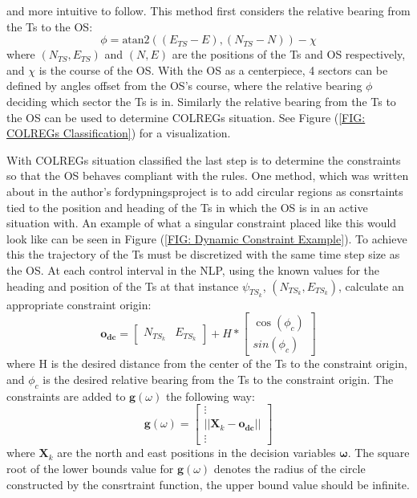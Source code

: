 and more intuitive to follow. This method first considers the relative bearing from the \gls{Ts} to the \gls{OS}:
\begin{equation}
    \phi = \textrm{atan2}((E_{TS} - E) , (N_{TS} - N)) - \chi
\end{equation}
where $(N_{TS}, E_{TS})$ and $(N, E)$ are the positions of the \gls{Ts} and \gls{OS} respectively, and $\chi$ is the course of the \gls{OS}.
With the \gls{OS} as a centerpiece, 4 sectors can be defined by angles offset from the \gls{OS}'s course, where
the relative bearing $\phi$ deciding which sector the \gls{Ts} is in. Similarly the relative bearing from the \gls{Ts} to the \gls{OS} can be
used to determine \gls{COLREGs} situation. See Figure (\ref{FIG: COLREGs Classification}) for a visualization.


With \gls{COLREGs} situation classified the last step is to determine the constraints so that the \gls{OS} behaves compliant with the rules.
One method, which was written about in the author's fordypningsproject is to add circular regions as consrtaints tied to the position and heading
of the \gls{Ts} in which the \gls{OS} is in an active situation with. An example of what a singular constraint placed like this would look like
can be seen in Figure (\ref{FIG: Dynamic Constraint Example}). To achieve this the trajectory of the \gls{Ts} must be discretized with the same
time step size as the \gls{OS}. At each control interval in the \gls{NLP}, using the known values for the heading 
and position of the \gls{Ts} at that instance $\psi_{TS_{k}}$, $(N_{TS_{k}}, E_{TS_{k}})$, calculate an appropriate constraint origin:
\begin{equation}
    \mathbf{o_{dc}} = \begin{bmatrix}
        N_{TS_{k}} & E_{TS_{k}}
                    \end{bmatrix} + H * \begin{bmatrix}
                                        \cos(\phi_c) \\
                                        sin(\phi_c)
                                        \end{bmatrix}
\end{equation}
where H is the desired distance from the center of the \gls{Ts} to the constraint origin, and $\phi_c$ is the desired relative
bearing from the \gls{Ts} to the constraint origin. The constraints are added to $\textbf{g}(\omega)$ the following way:
\begin{equation} \label{EQ: dynamic constraint in g}
    \textbf{g}(\omega) = \begin{bmatrix}
        \vdots \\
        ||\textbf{X}_k - \mathbf{o_{dc}}||\\
        \vdots
    \end{bmatrix}
\end{equation}
where $\textbf{X}_k$ are the north and east positions in the decision variables $\bm{\omega}$. The square root of the lower bounds value
for $\textbf{g}(\omega)$ denotes the radius of the circle constructed by the consrtraint function, the upper bound value should be infinite.

